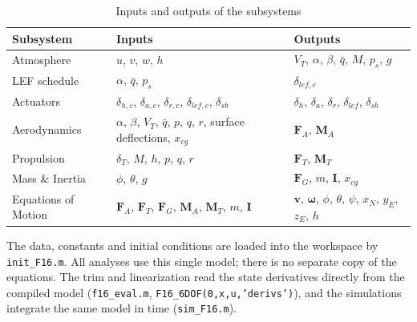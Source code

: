 \documentclass[conf]{new-aiaa}
\begin{document}
\begin{table}[hbt!]
\caption{\label{tab:io} Inputs and outputs of the subsystems}
\centering
\small
\begin{tabular}{lll}
\toprule
Subsystem & Inputs & Outputs \\
\midrule
Atmosphere & $u$, $v$, $w$, $h$ & $V_T$, $\alpha$, $\beta$, $\bar q$, $M$, $p_s$, $g$ \\
LEF schedule & $\alpha$, $\bar q$, $p_s$ & $\delta_{lef,c}$ \\
Actuators & $\delta_{h,c}$, $\delta_{a,c}$, $\delta_{r,c}$, $\delta_{lef,c}$, $\delta_{sb}$ & $\delta_h$, $\delta_a$, $\delta_r$, $\delta_{lef}$, $\delta_{sb}$ \\
Aerodynamics & $\alpha$, $\beta$, $V_T$, $\bar q$, $p$, $q$, $r$, surface deflections, $x_{cg}$ & $\mathbf F_A$, $\mathbf M_A$ \\
Propulsion & $\delta_T$, $M$, $h$, $p$, $q$, $r$ & $\mathbf F_T$, $\mathbf M_T$ \\
Mass \& Inertia & $\phi$, $\theta$, $g$ & $\mathbf F_G$, $m$, $\mathbf I$, $x_{cg}$ \\
Equations of Motion & $\mathbf F_A$, $\mathbf F_T$, $\mathbf F_G$, $\mathbf M_A$, $\mathbf M_T$, $m$, $\mathbf I$ & $\mathbf v$, $\boldsymbol\omega$, $\phi$, $\theta$, $\psi$, $x_N$, $y_E$, $z_E$, $h$ \\
\bottomrule
\end{tabular}
\end{table}

The data, constants and initial conditions are loaded into the workspace by \texttt{init\_F16.m}. All analyses use this single model; there is no separate copy of the equations. The trim and linearization read the state derivatives directly from the compiled model (\texttt{f16\_eval.m}, \texttt{F16\_6DOF(0,x,u,'derivs')}), and the simulations integrate the same model in time (\texttt{sim\_F16.m}).
\end{document}
